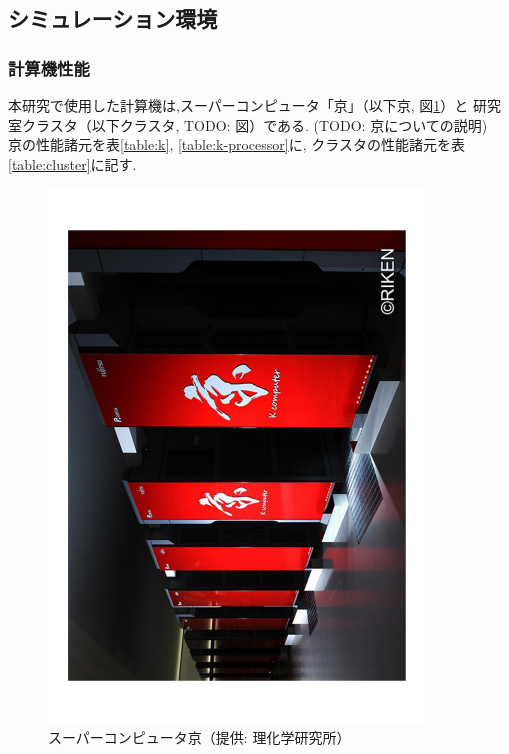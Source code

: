\subsection{シミュレーション環境}
\subsubsection{計算機性能}
本研究で使用した計算機は,スーパーコンピュータ「京」（以下京, 図\ref{fig:k}）と
研究室クラスタ（以下クラスタ, TODO: 図）である. (TODO: 京についての説明)\\
京の性能諸元\cite{riken-system}を表\ref{table:k}, \ref{table:k-processor}に, クラスタの性能諸元\cite{riken-system}を表\ref{table:cluster}に記す.\\

\begin{figure}[htb]
  \begin{center}
    \includegraphics[width=10.0cm, angle=-90]{./images/k}
    \caption{スーパーコンピュータ京（提供: 理化学研究所）}
    \label{fig:k}
  \end{center}
\end{figure}~\\
